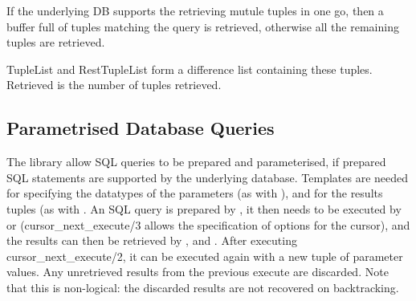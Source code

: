If the underlying DB supports the retrieving mutule tuples in one go, then
a buffer full of tuples matching the query is retrieved, otherwise all the
remaining tuples are retrieved.

TupleList and RestTupleList form a difference list containing these
tuples. Retrieved is the number of tuples retrieved.


\subsection{Parametrised Database Queries}

\begin{sloppypar}
The library allow SQL queries to be prepared and parameterised, if prepared
SQL statements are supported by the underlying database. Templates are needed
for specifying the datatypes of the parameters (as with
),
and for the results tuples (as with . An SQL query
is prepared by
,
it then needs to be executed by
 or
(cursor_next_execute/3 allows the specification of options for the cursor),
and the results can then be retrieved by ,
 and
. After
executing cursor_next_execute/2, it can be executed again with a new tuple
of parameter values. Any unretrieved results from the previous execute are
discarded. Note that this is non-logical: the discarded results are not
recovered on backtracking.
\end{sloppypar}

\subsubsection
{}
\label{session-prepare-sql-query/5}

